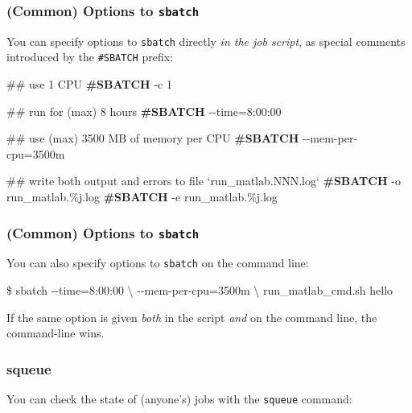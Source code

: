 \documentclass[english,serif,mathserif,usenames,dvipsnames]{beamer}
\begin{document}
\begin{frame}[fragile]
  \frametitle{(Common) Options to \texttt{sbatch}}

  You can specify options to \texttt{sbatch} directly \emph{in the job
    script}, as special comments introduced by the \texttt{\#SBATCH}
  prefix:

  \begin{semiverbatim}\footnotesize\ttfamily
 ## use 1 CPU
{\bfseries #SBATCH} -c 1

 ## run for (max) 8 hours
{\bfseries #SBATCH} -{}-time=8:00:00

 ## use (max) 3500 MB of memory per CPU
{\bfseries #SBATCH} -{}-mem-per-cpu=3500m

 ## write both output and errors to file `run_matlab.NNN.log`
{\bfseries #SBATCH} -o run_matlab.\%j.log
{\bfseries #SBATCH} -e run_matlab.\%j.log
  \end{semiverbatim}
\end{frame}


\begin{frame}[fragile]
  \frametitle{(Common) Options to \texttt{sbatch}}

  You can also specify options to \texttt{sbatch} on the
  command line:

  \begin{semiverbatim}
\$ sbatch -{}-time=8:00:00 \textbackslash
          -{}-mem-per-cpu=3500m \textbackslash
          run_matlab_cmd.sh hello
\end{semiverbatim}

  \+ If the same option is given \emph{both} in the script \emph{and}
  on the command line, the command-line wins.
\end{frame}


\begin{frame}[fragile]
  \frametitle{squeue}
  You can check the state of (anyone's) jobs with the \texttt{squeue}
  command:


\end{frame}
\end{document}
